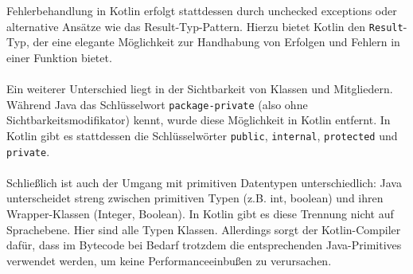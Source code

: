 \documentclass[11pt]{article}
\begin{document}
    Fehlerbehandlung in Kotlin erfolgt stattdessen durch unchecked exceptions oder alternative Ansätze wie das Result-Typ-Pattern.
    Hierzu bietet Kotlin den \texttt{Result}-Typ, der eine elegante Möglichkeit zur Handhabung von Erfolgen und Fehlern in einer Funktion bietet.\\
    \\
    Ein weiterer Unterschied liegt in der Sichtbarkeit von Klassen und Mitgliedern.
    Während Java das Schlüsselwort \texttt{package-private} (also ohne Sichtbarkeitsmodifikator) kennt, wurde diese Möglichkeit in Kotlin entfernt.
    In Kotlin gibt es stattdessen die Schlüsselwörter \texttt{public}, \texttt{internal}, \texttt{protected} und \texttt{private}.\\
    \\
    Schließlich ist auch der Umgang mit primitiven Datentypen unterschiedlich: Java unterscheidet streng zwischen primitiven Typen (z.B. int, boolean) und ihren Wrapper-Klassen (Integer, Boolean).
    In Kotlin gibt es diese Trennung nicht auf Sprachebene.
    Hier sind alle Typen Klassen.
    Allerdings sorgt der Kotlin-Compiler dafür, dass im Bytecode bei Bedarf trotzdem die entsprechenden Java-Primitives verwendet werden, um keine Performanceeinbußen zu verursachen.
    \cite{doc-comparison}
\end{document}
